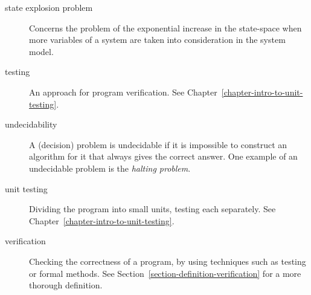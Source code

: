 \documentclass[a4paper,11pt]{kth-mag}
\theoremstyle{definition}
\begin{document}
\begin{description}
  \item[state explosion problem] Concerns the problem of the exponential
    increase in the state-space when more variables of a system are taken into
    consideration in the system model.

  \item[testing] An approach for program verification. See
    Chapter~\ref{chapter-intro-to-unit-testing}.

  \item[undecidability] A (decision) problem is undecidable if it is impossible
    to construct an algorithm for it that always gives the correct answer. One
    example of an undecidable problem is the \textit{halting problem}.

  \item[unit testing] Dividing the program into small units, testing each
    separately. See Chapter~\ref{chapter-intro-to-unit-testing}.

  \item[verification] Checking the correctness of a program, by using
    techniques such as testing or formal methods. See
    Section~\ref{section-definition-verification} for a more thorough
    definition.
\end{description}
\end{document}
